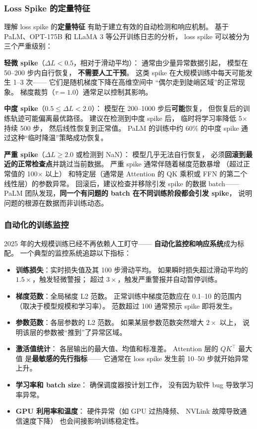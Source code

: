 \subsubsection{Loss Spike 的定量特征}

理解 loss spike 的\textbf{定量特征}
有助于建立有效的自动检测和响应机制。
基于 PaLM、OPT-175B 和 LLaMA 3 等公开训练日志的分析，
loss spike 可以被分为三个严重级别：

\textbf{轻微 spike}（$\Delta L < 0.5$，相对于滑动平均）：
通常由少量异常数据引起，
模型在 50--200 步内自行恢复，
\textbf{不需要人工干预}。
这类 spike 在大规模训练中每天可能发生 1--3 次——
它们是随机梯度下降在高维空间中
``偶尔走到陡峭区域''的正常现象。
梯度裁剪（$\tau = 1.0$）通常足以控制其影响。

\textbf{中度 spike}（$0.5 \leq \Delta L < 2.0$）：
模型在 200--1000 步后\textbf{可能}恢复，
但恢复后的训练轨迹可能偏离最优路径。
建议在检测到中度 spike 后，
临时将学习率降低 5$\times$ 持续 500 步，
然后线性恢复到正常值。
PaLM 的训练中约 60\% 的中度 spike
通过这种``临时降温''策略成功恢复。

\textbf{严重 spike}（$\Delta L \geq 2.0$ 或检测到 NaN）：
模型几乎无法自行恢复，
必须\textbf{回滚到最近的正常检查点}并跳过当前数据。
严重 spike 通常伴随着梯度范数暴增
（超过正常值的 100$\times$ 以上）
和特定层（通常是 Attention 的 QK 乘积或
FFN 的第二个线性层）的参数异常。
回滚后，建议检查并移除引发 spike 的数据 batch——
PaLM 团队发现，\textbf{同一个有问题的 batch
在不同训练阶段都会引发 spike}，
说明问题的根源在数据而非训练动态。

\subsubsection{自动化的训练监控}

2025 年的大规模训练已经不再依赖人工盯守——
\textbf{自动化监控和响应系统}成为标配。
一个典型的监控系统追踪以下指标：

\begin{itemize}[noitemsep]
  \item \textbf{训练损失}：实时损失值及其 100 步滑动平均。
        如果瞬时损失超过滑动平均的 $1.5\times$，触发轻微警报；
        超过 $3\times$，触发严重警报并自动暂停训练。
  \item \textbf{梯度范数}：全局梯度 L2 范数。
        正常训练中梯度范数应在 0.1--10 的范围内
        （取决于模型规模和学习率）。
        范数超过 100 通常预示 spike 即将发生。
  \item \textbf{参数范数}：各层参数的 L2 范数。
        如果某层参数范数突然增大 $2\times$ 以上，
        说明该层的参数被``推到''了异常区域。
  \item \textbf{激活值统计}：
        各层输出的最大值、均值和标准差。
        Attention 层的 $QK^\top$ 最大值
        是\textbf{最敏感的先行指标}——
        它通常在 loss spike 发生前 10--50 步就开始异常上升。
  \item \textbf{学习率和 batch size}：
        确保调度器按计划工作，
        没有因为软件 bug 导致学习率异常。
  \item \textbf{GPU 利用率和温度}：
        硬件异常（如 GPU 过热降频、
        NVLink 故障导致通信速度下降）
        也会间接影响训练稳定性。
\end{itemize}

